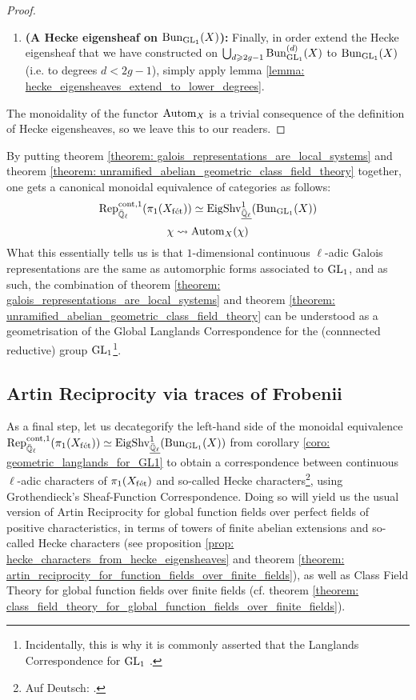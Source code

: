\begin{proof}
\begin{enumerate}
                        \item \textbf{(A Hecke eigensheaf on $\mathrm{Bun}_{\operatorname{GL}_1}(X)$):} Finally, in order extend the Hecke eigensheaf that we have constructed on $\bigcup_{d \geqslant 2g - 1} \mathrm{Bun}_{\operatorname{GL}_1}^{(d)}(X)$ to $\mathrm{Bun}_{\operatorname{GL}_1}(X)$ (i.e. to degrees $d < 2g - 1$), simply apply lemma \ref{lemma: hecke_eigensheaves_extend_to_lower_degrees}.
                    \end{enumerate}
                The monoidality of the functor $\mathrm{Autom}_X$ is a trivial consequence of the definition of Hecke eigensheaves, so we leave this to our readers.
            \end{proof}
        
        \begin{corollary} \label{coro: geometric_langlands_for_GL1}
            By putting theorem \ref{theorem: galois_representations_are_local_systems} and theorem \ref{theorem: unramified_abelian_geometric_class_field_theory} together, one gets a canonical monoidal equivalence of categories as follows:
                $$\mathrm{Rep}^{\mathrm{cont}, 1}_{\bar{\mathbb{Q}}_{\ell}}(\pi_1(X_{\mathrm{f\acute{e}t}})) \simeq \mathrm{Eig}\mathrm{Shv}_{\underline{\bar{\mathbb{Q}}_{\ell}}}^1(\mathrm{Bun}_{\operatorname{GL}_1}(X))$$
                $$\chi \leadsto \mathrm{Autom}_X(\chi)$$
            What this essentially tells us is that $1$-dimensional continuous $\ell$-adic Galois representations are the same as automorphic forms associated to $\operatorname{GL}_1$, and as such, the combination of theorem \ref{theorem: galois_representations_are_local_systems} and theorem \ref{theorem: unramified_abelian_geometric_class_field_theory} can be understood as a geometrisation of the Global Langlands Correspondence for the (connnected reductive) group $\operatorname{GL}_1$\footnote{Incidentally, this is why it is commonly asserted that the Langlands Correspondence for $\operatorname{GL}_1$ .}. 
        \end{corollary}
        
    \subsection{Artin Reciprocity via traces of Frobenii}
        As a final step, let us decategorify the left-hand side of the monoidal equivalence $\mathrm{Rep}^{\mathrm{cont}, 1}_{\bar{\mathbb{Q}}_{\ell}}(\pi_1(X_{\mathrm{f\acute{e}t}})) \simeq \mathrm{Eig}\mathrm{Shv}_{\underline{\bar{\mathbb{Q}}_{\ell}}}^1(\mathrm{Bun}_{\operatorname{GL}_1}(X))$ from corollary \ref{coro: geometric_langlands_for_GL1} to obtain a correspondence between continuous $\ell$-adic characters of $\pi_1(X_{\mathrm{f\acute{e}t}})$ and so-called Hecke characters\footnote{Auf Deutsch: .}, using Grothendieck's Sheaf-Function Correspondence. Doing so will yield us the usual version of Artin Reciprocity for global function fields over perfect fields of positive characteristics, in terms of towers of finite abelian extensions and so-called Hecke characters (see proposition \ref{prop: hecke_characters_from_hecke_eigensheaves} and theorem \ref{theorem: artin_reciprocity_for_function_fields_over_finite_fields}), as well as Class Field Theory for global function fields over finite fields (cf. theorem \ref{theorem: class_field_theory_for_global_function_fields_over_finite_fields}).
        
